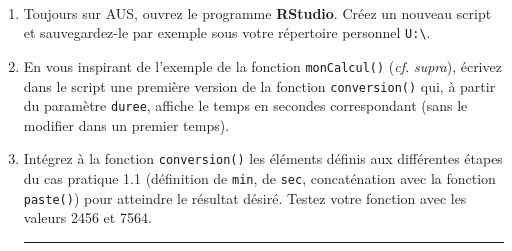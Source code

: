 \documentclass[12pt,twosided, notitlepage]{book}
\newenvironment{Shaded}{}{}
\newcommand{\KeywordTok}[1]{\textcolor[rgb]{0.00,0.00,1.00}{#1}}
\newcommand{\DecValTok}[1]{#1}
\newcommand{\StringTok}[1]{\textcolor[rgb]{0.00,0.50,0.50}{#1}}
\newcommand{\CommentTok}[1]{\textcolor[rgb]{0.00,0.50,0.00}{#1}}
\newcommand{\ControlFlowTok}[1]{\textcolor[rgb]{0.00,0.00,1.00}{#1}}
\newcommand{\NormalTok}[1]{#1}
\newif \ifsol
\renewenvironment{Shaded}{\begin{snugshade}}{\end{snugshade}}
\begin{document}
~

\begin{enumerate}
\def\labelenumi{\alph{enumi}.}
\item
  Toujours sur AUS, ouvrez le programme \textbf{RStudio}. Créez un
  nouveau script et sauvegardez-le par exemple sous votre répertoire
  personnel \texttt{U:\textbackslash{}}.
\item
  En vous inspirant de l'exemple de la fonction \texttt{monCalcul()}
  (\emph{cf.} \emph{supra}), écrivez dans le script une première version
  de la fonction \texttt{conversion()} qui, à partir du paramètre
  \texttt{duree}, affiche le temps en secondes correspondant (sans le
  modifier dans un premier temps).

  \ifsol 

  \begin{center} \rule{0.5\linewidth}{\linethickness}\end{center}

\begin{Shaded}
\begin{Highlighting}[]
\CommentTok{# La structure de base d'une définition de fonction est simple :}
\CommentTok{# l'opérateur d'assignation est utilisé pour associer à un nom}
\CommentTok{# le code de la fonction}
\NormalTok{conversion <-}\StringTok{ }\ControlFlowTok{function}\NormalTok{(duree)\{}
  \KeywordTok{return}\NormalTok{(duree)}
\NormalTok{\}}
\CommentTok{# Dans cette première version, on ne fait que renvoyer la valeur}
\CommentTok{# de duree à l'identique.}
\KeywordTok{conversion}\NormalTok{(}\DecValTok{2456}\NormalTok{)}
\NormalTok{  ## [1] 2456}
\end{Highlighting}
\end{Shaded}

  \begin{center} \rule{0.5\linewidth}{\linethickness}\end{center}

  \bigskip  \fi 
\item
  Intégrez à la fonction \texttt{conversion()} les éléments définis aux
  différentes étapes du cas pratique 1.1 (définition de \texttt{min}, de
  \texttt{sec}, concaténation avec la fonction \texttt{paste()}) pour
  atteindre le résultat désiré. Testez votre fonction avec les valeurs
  2456 et 7564.

  \ifsol 

  \begin{center} \rule{0.5\linewidth}{\linethickness}\end{center}


\end{enumerate}
\end{document}
